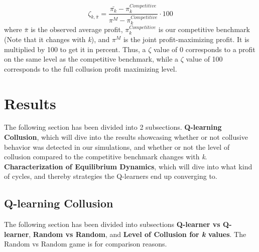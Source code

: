 \documentclass{article}
\begin{document}
\begin{equation}
\label{zeta}
    \zeta_{k,\bar{\pi}} = \frac{\bar{\pi_k} - \pi^{Competitive}_k}{\pi^M - \pi^{Competitive}_k} \cdot 100 
\end{equation}
where \(\bar{\pi}\) is the observed average profit, \(\pi^{Competitive}_k\) is our competitive benchmark (Note that it changes with \textit{k}), and \(\pi^M\) is the joint profit-maximizing profit. It is multiplied by 100 to get it in percent. 
Thus, a $\zeta$ value of 0 corresponds to a profit on the same level as the competitive benchmark, while a $\zeta$ value of 100 corresponds to the full collusion profit maximizing level.


\section{Results}
\label{Results section}
The following section has been divided into 2 subsections. \textbf{Q-learning Collusion}, which will dive into the results showcasing whether or not collusive behavior was detected in our simulations, and whether or not the level of collusion compared to the competitive benchmark changes with \textit{k}. \textbf{Characterization of Equilibrium Dynamics}, which will dive into what kind of cycles, and thereby strategies the Q-learners end up converging to.
\subsection{Q-learning Collusion}
\label{Q-learning Collusion}
The following section has been divided into subsections \textbf{Q-learner vs Q-learner}, \textbf{Random vs Random}, and \textbf{Level of Collusion for \textit{k} values}. The Random vs Random game is for comparison reasons.
\end{document}
